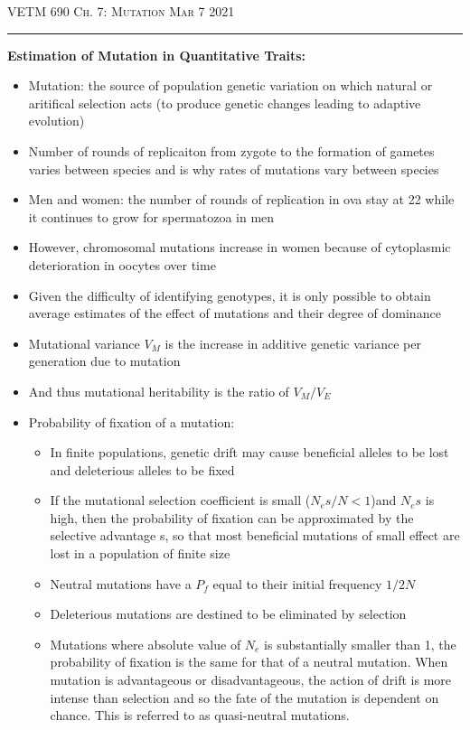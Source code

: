 \documentclass[12pt]{amsart}
\begin{document}
\thispagestyle{empty}

{\scshape VETM 690} \hfill {\scshape \Large  Ch. 7: Mutation} \hfill {\scshape Mar 7 2021}
\medskip
\hrule
\bigskip

{\large \bf Estimation of Mutation in Quantitative Traits:}
\begin{itemize}
\item Mutation: the source of population genetic variation on which natural or aritifical selection acts (to produce genetic changes leading to adaptive evolution)
\item Number of rounds of replicaiton from zygote to the formation of gametes varies between species and is why rates of mutations vary between species
\item Men and women: the number of rounds of replication in ova stay at 22 while it continues to grow for spermatozoa in men
\item However, chromosomal mutations increase in women because of cytoplasmic deterioration in oocytes over time
\item Given the difficulty of identifying genotypes, it is only possible to obtain average estimates of the effect of mutations and their degree of dominance
\item Mutational variance $V_M$ is the increase in additive genetic variance per generation due to mutation
\item And thus mutational heritability is the ratio of $V_M/V_E$ 
\item Probability of fixation of a mutation:
\begin{itemize}
\item In finite populations, genetic drift may cause beneficial alleles to be lost and deleterious alleles to be fixed 
\item If the mutational selection coefficient is small ($N_es/N < 1$)and $N_es$ is high, then the probability of fixation can be approximated by the selective advantage s, so that most beneficial mutations of small effect are lost in a population of finite size
\item Neutral mutations have a $P_f$ equal to their initial frequency $1/2N$
\item Deleterious mutations are destined to be eliminated by selection 
\item Mutations where absolute value of $N_e$ is substantially smaller than 1, the probability of fixation is the same for that of a neutral mutation. When mutation is advantageous or disadvantageous, the action of drift is more intense than selection and so the fate of the mutation is dependent on chance. This is referred to as quasi-neutral mutations. 

\end{itemize}
\end{itemize}
\end{document}

